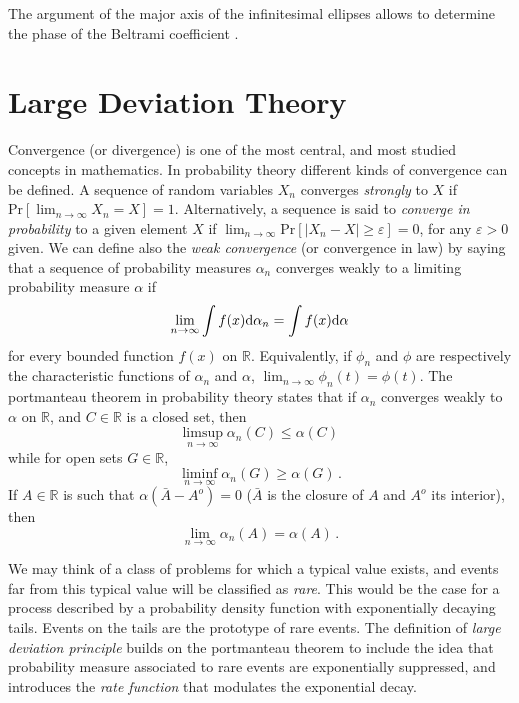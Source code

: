 \documentclass[twocolumn,aps,reprint, nofootinbib]{revtex4}
\newcommand{\dd}{{\rm d}}
\begin{document}
The argument of the major axis of the infinitesimal ellipses allows to determine the phase of the Beltrami coefficient \cite{straumann}.

\section{Large Deviation Theory}
\label{Large_dev}
Convergence (or divergence) is one of the most central, and most studied concepts in mathematics. In probability theory different kinds of convergence can be defined. A sequence of random variables $X_n$ converges \emph{strongly} to $X$ if $\mathrm{Pr}[\lim_{n \to \infty} X_n = X] = 1$. Alternatively, a sequence is said to \emph{converge in probability} to a given element $X$ if $\lim_{n \to \infty} \mathrm{Pr}[|X_n - X| \geq \varepsilon] = 0$, for any $\varepsilon > 0$ given. We can define also the \emph{weak convergence} (or convergence in law) by saying that a sequence of probability measures $\alpha_n$ converges weakly to a limiting probability measure $\alpha$ if 
\begin{displaymath}
\lim_{n \to \infty} \int f(x) \dd \alpha_n = \int f(x) \dd \alpha
\end{displaymath}
for every bounded function $f(x)$ on $\mathbb{R}$. Equivalently, if $\phi_n$ and $\phi$ are respectively the characteristic functions of $\alpha_n$ and $\alpha$, $\lim_{n \to \infty} \phi_n(t) = \phi(t)$. The portmanteau theorem in probability theory \cite{varadhan_prob} states that if $\alpha_n$ converges weakly to $\alpha$ on $\mathbb{R}$, and $C \in \mathbb{R}$ is a closed set, then
\begin{displaymath}
\limsup_{n \to \infty} \alpha_n(C) \leq \alpha(C) \, 
\end{displaymath}
while for open sets $G \in \mathbb{R}$,
\begin{displaymath}
\liminf_{n \to \infty} \alpha_n(G) \geq \alpha(G) \, .
\end{displaymath}
If $A \in \mathbb{R}$ is such that $\alpha (\bar{A} - A^o) = 0$ ($\bar{A}$ is the closure of $A$ and $A^o$ its interior), then
\begin{displaymath}
\lim_{n \to \infty} \alpha_n(A) = \alpha(A) \, .
\end{displaymath}

We may think of a class of problems for which a typical value exists, and events far from this typical value will be classified as \emph{rare}. This would be the case for a process described by a probability density function with exponentially decaying tails. Events on the tails are the prototype of rare events. The definition of \emph{large deviation principle} builds on the portmanteau theorem to include the idea that probability measure associated to rare events are exponentially suppressed, and introduces the \emph{rate function} that modulates the exponential decay.
\end{document}
